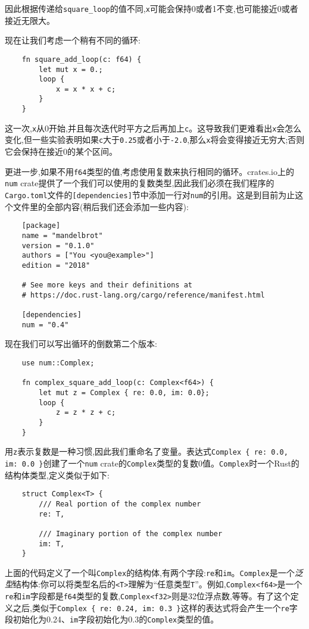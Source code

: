 因此根据传递给\texttt{square\_loop}的值不同,\texttt{x}可能会保持0或者1不变,也可能接近0或者接近无限大。

现在让我们考虑一个稍有不同的循环:
\begin{verbatim}
    fn square_add_loop(c: f64) {
        let mut x = 0.;
        loop {
            x = x * x + c;
        }
    }
\end{verbatim}

这一次,\texttt{x}从0开始,并且每次迭代时平方之后再加上\texttt{c}。这导致我们更难看出\texttt{x}会怎么变化,但一些实验表明如果\texttt{c}大于\texttt{0.25}或者小于\texttt{-2.0},那么\texttt{x}将会变得接近无穷大;否则它会保持在接近0的某个区间。

更进一步,如果不用\texttt{f64}类型的值,考虑使用复数来执行相同的循环。crates.io上的\texttt{num} crate提供了一个我们可以使用的复数类型,因此我们必须在我们程序的\texttt{Cargo.toml}文件的\texttt{[dependencies]}节中添加一行对\texttt{num}的引用。这是到目前为止这个文件里的全部内容(稍后我们还会添加一些内容):
\begin{verbatim}
    [package]
    name = "mandelbrot"
    version = "0.1.0"
    authors = ["You <you@example>"]
    edition = "2018"

    # See more keys and their definitions at
    # https://doc.rust-lang.org/cargo/reference/manifest.html

    [dependencies]
    num = "0.4"
\end{verbatim}

现在我们可以写出循环的倒数第二个版本:
\begin{verbatim}
    use num::Complex;

    fn complex_square_add_loop(c: Complex<f64>) {
        let mut z = Complex { re: 0.0, im: 0.0};
        loop {
            z = z * z + c;
        }
    }
\end{verbatim}

用\texttt{z}表示复数是一种习惯,因此我们重命名了变量。表达式\texttt{Complex \{ re: 0.0, im: 0.0 \}}创建了一个\texttt{num} crate的\texttt{Complex}类型的复数0值。\texttt{Complex}时一个Rust的结构体类型,定义类似于如下:
\begin{verbatim}
    struct Complex<T> {
        /// Real portion of the complex number
        re: T,

        /// Imaginary portion of the complex number
        im: T,
    }
\end{verbatim}

上面的代码定义了一个叫\texttt{Complex}的结构体,有两个字段:\texttt{re}和\texttt{im}。\texttt{Complex}是一个\emph{泛型}结构体:你可以将类型名后的\texttt{<T>}理解为“任意类型\texttt{T}”。例如,\texttt{Complex<f64>}是一个\texttt{re}和\texttt{im}字段都是\texttt{f64}类型的复数,\texttt{Complex<f32>}则是32位浮点数,等等。有了这个定义之后,类似于\texttt{Complex \{ re: 0.24, im: 0.3 \}}这样的表达式将会产生一个\texttt{re}字段初始化为0.24、\texttt{im}字段初始化为0.3的\texttt{Complex}类型的值。

